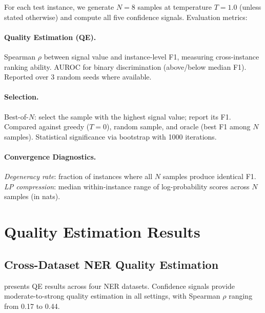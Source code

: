 \documentclass[11pt,a4paper]{article}
\begin{document}
For each test instance, we generate $N{=}8$ samples at temperature $T{=}1.0$ (unless stated otherwise) and compute all five confidence signals.
Evaluation metrics:

\paragraph{Quality Estimation (QE).}
Spearman $\rho$ between signal value and instance-level F1, measuring cross-instance ranking ability. AUROC for binary discrimination (above/below median F1). Reported over 3 random seeds where available.

\paragraph{Selection.}
Best-of-$N$: select the sample with the highest signal value; report its F1. Compared against greedy ($T{=}0$), random sample, and oracle (best F1 among $N$ samples). Statistical significance via bootstrap with 1000 iterations.

\paragraph{Convergence Diagnostics.}
\emph{Degeneracy rate}: fraction of instances where all $N$ samples produce identical F1.
\emph{LP compression}: median within-instance range of log-probability scores across $N$ samples (in nats).

\section{Quality Estimation Results}

\subsection{Cross-Dataset NER Quality Estimation}

 presents QE results across four NER datasets. Confidence signals provide moderate-to-strong quality estimation in all settings, with Spearman $\rho$ ranging from 0.17 to 0.44.
\end{document}
